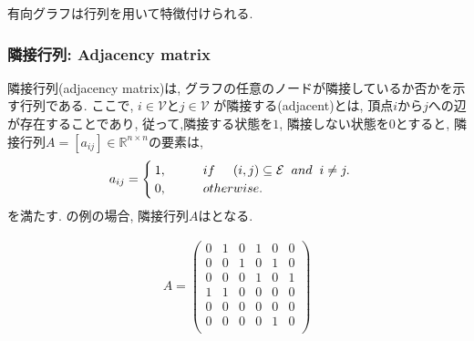 有向グラフは行列を用いて特徴付けられる.
\subsubsection*{隣接行列: Adjacency matrix}
隣接行列(adjacency matrix)は, グラフの任意のノードが隣接しているか否かを示す行列である.
ここで, $i \in\mathcal{V}$と$j \in\mathcal{V}$
が隣接する(adjacent)とは, 頂点$i$から$j$への辺が存在することであり, 
従って,隣接する状態を$1$, 隣接しない状態を$0$とすると, 
隣接行列$A=[a_{ij}]\in \mathbb{R}^{n\times n}$の要素は, 
\begin{align}
  a_{ij}=
  \begin{cases}
    1, \hspace*{1cm}if\hspace*{0.5cm}(i, j)\subseteq \mathcal{E}\hspace*{0.2cm}and\hspace*{0.2cm}i \neq j.\\
    0, \hspace*{1cm}otherwise.
  \end{cases}
\end{align}
を満たす.
の例の場合, 隣接行列$A$はとなる.

\begin{align}
  A=
  \begin{pmatrix}
    0&1&0&1&0&0\\
    0&0&1&0&1&0\\
    0&0&0&1&0&1\\
    1&1&0&0&0&0\\
    0&0&0&0&0&0\\
    0&0&0&0&1&0\\
  \end{pmatrix}  
  \label{eq:graph.adj}
\end{align}
